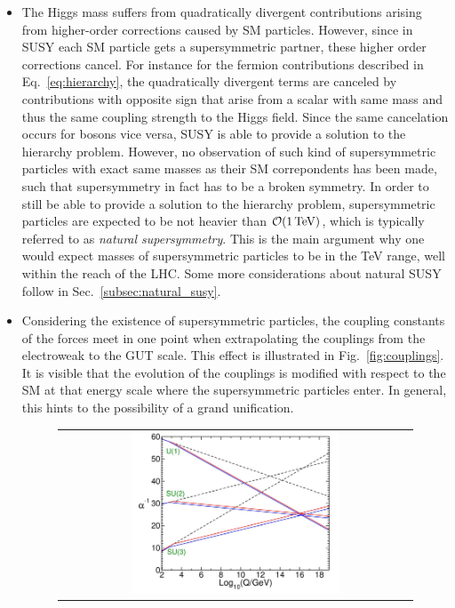 \begin{itemize}
 \item The Higgs mass suffers from quadratically divergent contributions arising from higher-order corrections caused by SM particles. However, since in SUSY each SM particle gets a supersymmetric partner, these higher order corrections cancel. For instance for the fermion contributions described in Eq.~\ref{eq:hierarchy}, the quadratically divergent terms are canceled by contributions with opposite sign that arise from a scalar with same mass and thus the same coupling strength to the Higgs field. Since the same cancelation occurs for bosons vice versa, SUSY is able to provide a solution to the hierarchy problem. However, no observation of such kind of supersymmetric particles with exact same masses as their SM correpondents has been made, such that supersymmetry in fact has to be a broken symmetry. In order to still be able to provide a solution to the hierarchy problem, supersymmetric particles are expected to be not heavier than $\mathcal{O}(\mathrm{1\,\text{Te}\kern-0.06667em\text{V}})$, which is typically referred to as \textit{natural supersymmetry}. This is the main argument why one would expect masses of supersymmetric particles to be in the TeV range, well within the reach of the LHC. Some more considerations about natural SUSY follow in Sec.~\ref{subsec:natural_susy}.
 \item Considering the existence of supersymmetric particles, the coupling constants of the forces meet in one point when extrapolating the couplings from the electroweak to the GUT scale. This effect is illustrated in Fig.~\ref{fig:couplings}. It is visible that the evolution of the couplings is modified with respect to the SM at that energy scale where the supersymmetric particles enter. In general, this hints to the possibility of a grand unification.
\begin{figure}[!t]
  \centering
  \begin{tabular}{c}
    \includegraphics[width=0.6\textwidth]{figures/Couplings.jpg}

\end{tabular}
\end{figure}
\end{itemize}

